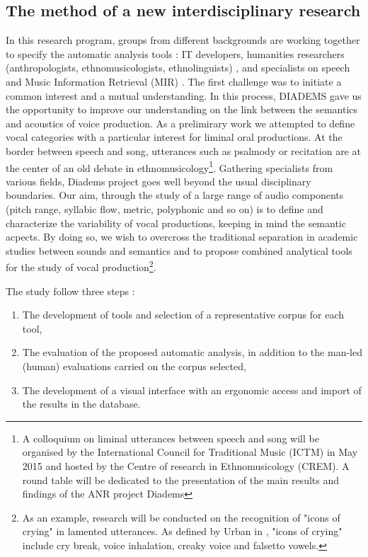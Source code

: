 \documentclass{sig-alternate}
\begin{document}
\subsection{The method of a new interdisciplinary research}

In this research program, groups from different backgrounds are working together to specify the automatic analysis tools :  IT developers, humanities researchers (anthropologists, ethnomusicologists, ethnolinguists) , and specialists on speech and Music Information Retrieval (MIR) . The first challenge was to initiate a common interest and a mutual understanding. In this process, DIADEMS gave us the opportunity  to improve our understanding on the link between the semantics and acoustics of voice production. As a prelimirary work we attempted to define vocal categories with a particular interest for liminal oral productions. At the border between speech and song, utterances such as psalmody or recitation are at the center of an old debate in ethnomusicology\footnote{A colloquium on liminal utterances between speech and song will be organised by the International Council for Traditional Music (ICTM) in May 2015 and hosted by the Centre of research in Ethnomusicology (CREM). A round table will be dedicated to the presentation of the main results and findings of the ANR project Diadems}. Gathering specialists from various fields, Diadems project goes well beyond the usual disciplinary boundaries. Our aim, through the study of a large range of audio components (pitch range, syllabic flow, metric, polyphonic and so on) is to define and characterize the variability of vocal productions, keeping in mind the semantic acpects. By doing so, we wish to overcross the traditional separation in academic studies between sounds and semantics and to propose combined analytical tools for the study of vocal production\footnote{As an example, research will be conducted on the recognition of "icons of crying" 
in lamented utterances. As defined by Urban in \cite{Urban88}, "icons of crying" include cry break, voice inhalation, creaky voice and falsetto vowels.}. 

The study follow three steps : 
\begin{enumerate}
\item The development of tools and selection of a representative corpus
  for each tool,
\item The evaluation of the proposed automatic analysis, in addition to
  the man-led (human) evaluations carried on the corpus selected,
\item The development of a visual interface with an ergonomic access and
  import of the results in the database.
\end{enumerate}
\end{document}
